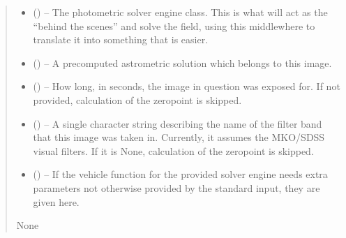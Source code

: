 \documentclass[letterpaper,11pt,english]{sphinxmanual}
\begin{document}
\begin{savenotes}
\begin{fulllineitems}
\begin{savenotes}
\begin{fulllineitems}
\begin{quote}
\begin{description}
\begin{itemize}
\item {} 
\sphinxAtStartPar
{} ({\hyperref[\detokenize{code/opihiexarata.library.engine:opihiexarata.library.engine.PhotometryEngine}]{}}) – The photometric solver engine class. This is what will act as the
“behind the scenes” and solve the field, using this middlewhere to
translate it into something that is easier.

\item {} 
\sphinxAtStartPar
{} ({\hyperref[\detokenize{code/opihiexarata.astrometry.solution:opihiexarata.astrometry.solution.AstrometricSolution}]{}}\sphinxstyleliteralemphasis{\sphinxupquote{, }}) – A precomputed astrometric solution which belongs to this image.

\item {} 
\sphinxAtStartPar
{} (\sphinxstyleliteralemphasis{\sphinxupquote{, }}) – How long, in seconds, the image in question was exposed for. If
not provided, calculation of the zero\sphinxhyphen{}point is skipped.

\item {} 
\sphinxAtStartPar
{} (\sphinxstyleliteralemphasis{\sphinxupquote{, }}) – A single character string describing the name of the filter band that
this image was taken in. Currently, it assumes the MKO/SDSS visual
filters. If it is None, calculation of the zero\sphinxhyphen{}point is skipped.

\item {} 
\sphinxAtStartPar
{} () – If the vehicle function for the provided solver engine needs
extra parameters not otherwise provided by the standard input,
they are given here.

\end{itemize}

\sphinxAtStartPar
None


\end{description}
\end{quote}
\end{fulllineitems}
\end{savenotes}
\end{fulllineitems}
\end{savenotes}
\end{document}
